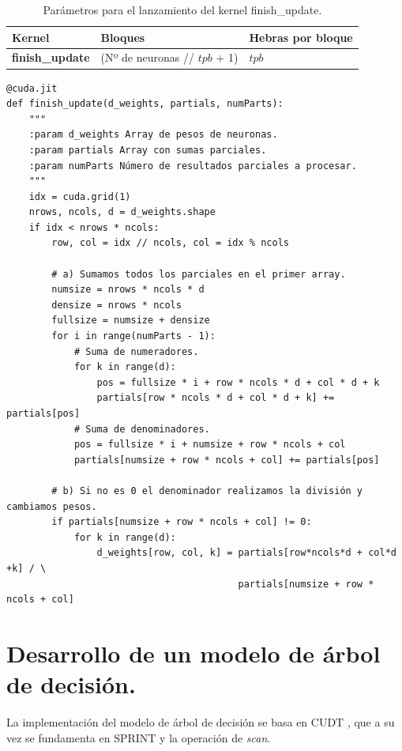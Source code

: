 \begin{table}[ht]
\begin{tabular}{@{}lll@{}}
\toprule
\textbf{Kernel}        & \textbf{Bloques}                                 & \textbf{Hebras por bloque}                                                                       \\ \midrule
\textbf{finish\_update} & (Nº de neuronas // $tpb$ + 1) & $tpb$ \\ \bottomrule
\end{tabular}
\caption{Parámetros para el lanzamiento del kernel finish\_update.}
\label{tab:updatekernel}
\end{table}

\begin{code}
\begin{verbatim}
@cuda.jit
def finish_update(d_weights, partials, numParts):
    """
    :param d_weights Array de pesos de neuronas.
    :param partials Array con sumas parciales.
    :param numParts Número de resultados parciales a procesar.
    """
    idx = cuda.grid(1)
    nrows, ncols, d = d_weights.shape
    if idx < nrows * ncols:
        row, col = idx // ncols, col = idx % ncols
        
        # a) Sumamos todos los parciales en el primer array.
        numsize = nrows * ncols * d
        densize = nrows * ncols
        fullsize = numsize + densize
        for i in range(numParts - 1):
            # Suma de numeradores.
            for k in range(d):
                pos = fullsize * i + row * ncols * d + col * d + k
                partials[row * ncols * d + col * d + k] += partials[pos]
            # Suma de denominadores.
            pos = fullsize * i + numsize + row * ncols + col
            partials[numsize + row * ncols + col] += partials[pos]
    
        # b) Si no es 0 el denominador realizamos la división y cambiamos pesos.
        if partials[numsize + row * ncols + col] != 0:
            for k in range(d):
                d_weights[row, col, k] = partials[row*ncols*d + col*d +k] / \
                                         partials[numsize + row * ncols + col]
\end{verbatim}
\label{code:ending}
\end{code}

\newpage
\section{Desarrollo de un modelo de árbol de decisión.}
La implementación del modelo de árbol de decisión se basa en CUDT \cite{cudt}, que a su vez se fundamenta en SPRINT \cite{sprint} y la operación de \textit{scan}.

